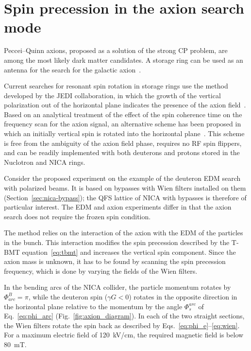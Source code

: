 \section{Spin precession in the axion search mode}
\label{sec:axion}

Peccei--Quinn axions, proposed as a solution of the strong CP problem, are
among the most likely dark matter candidates. A storage ring can be used as an
antenna for the search for the galactic axion~\cite{Nikolaev:2022wyi}.

Current searches for resonant spin rotation in storage rings use the method
developed by the JEDI collaboration, in which the growth of the vertical
polarization out of the horizontal plane indicates the presence of the axion
field~\cite{Nikolaev:2022wyi}. Based on an analytical treatment of the effect of the spin coherence
time on the frequency scan for the axion signal, an alternative scheme has been
proposed in which an initially vertical spin is rotated into the horizontal
plane~\cite{Nikolaev:2022wyi}. This scheme is free from the ambiguity of the
axion field phase, requires no RF spin flippers, and can be readily
implemented with both deuterons and protons stored in the Nuclotron and NICA
rings.

Consider the proposed experiment on the example of the deuteron EDM search
with polarized beams. It is based on bypasses with Wien filters installed on
them (Section~\ref{sec:nica-bypass}); the QFS lattice of NICA with bypasses is
therefore of particular interest. The EDM and axion experiments differ in that
the axion search does not require the frozen spin condition.

The method relies on the interaction of the axion with the EDM of the particles
in the bunch. This interaction modifies the spin precession described by the
T-BMT equation~\eqref{eq:tbmt} and increases the vertical spin component. Since
the axion mass is unknown, it has to be found by scanning the spin precession
frequency, which is done by varying the fields of the Wien filters.

In the bending arcs of the NICA collider, the particle momentum rotates by
$\Phi^B_{arc} = \pi$, while the deuteron spin ($\gamma G<0$) rotates in the
opposite direction in the horizontal plane relative to the momentum by the
angle $\Phi_s^{arc}$ of Eq.~\eqref{eq:phi_arc} (Fig.~\ref{fig:axion_diagram}).
In each of the two straight sections, the Wien filters rotate the spin back as
described by Eqs.~\eqref{eq:phi_e}--\eqref{eq:wien}. For a maximum electric
field of \SI{120}{kV/cm}, the required magnetic field is below \SI{80}{mT}.

